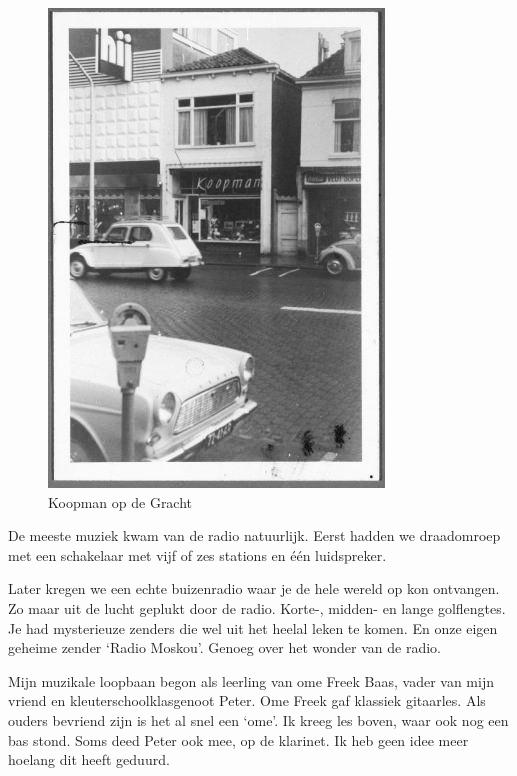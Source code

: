 \documentclass[10pt,twoside, openright]{memoir}
\begin{document}
\begin{figure}
\includegraphics[width=\textwidth]{img/128 koopman}
\caption*{\footnotesize Koopman op de Gracht}
\end{figure}

De meeste muziek kwam van de radio natuurlijk. Eerst hadden we draadomroep met een schakelaar met vijf of zes stations en één luidspreker. 

Later kregen we een echte buizenradio waar je de hele wereld op kon ontvangen. Zo maar uit de lucht geplukt door de radio. Korte-, midden- en lange golflengtes. Je had mysterieuze zenders die wel uit het heelal leken te komen. En onze eigen geheime zender `Radio Moskou’. Genoeg over het wonder van de radio.

Mijn muzikale loopbaan begon als leerling van ome Freek Baas, vader van mijn vriend en kleuterschoolklasgenoot Peter. Ome Freek gaf klassiek gitaarles. Als ouders bevriend zijn is het al snel een `ome'. Ik kreeg les boven, waar ook nog een bas stond. Soms deed Peter ook mee, op de klarinet. Ik heb geen idee meer hoelang dit heeft geduurd. 
\end{document}
